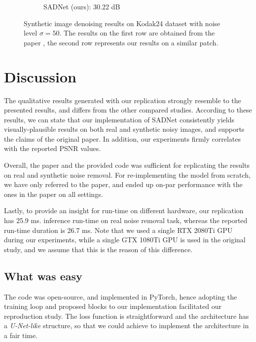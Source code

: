 \begin{figure}[t!]
\begin{subfigure}{0.25\textwidth}
      \caption{SADNet (ours): 30.22 dB}
      \label{fig:kodak_out}
    \end{subfigure}
    \caption{Synthetic image denoising results on Kodak24 dataset with noise level $\sigma = 50$. The results on the first row are obtained from the paper \cite{10.1007/978-3-030-58577-8_11}, the second row represents our results on a similar patch.}
    \label{fig:kodak_table}
\end{figure}


\section{Discussion}


The qualitative results generated with our replication strongly resemble to the presented results, and differs from the other compared studies. According to these results, we can state that our implementation of SADNet consistently yields visually-plausible results on both real and synthetic noisy images, and supports the claims of the original paper. In addition, our experiments firmly correlates with the reported PSNR values.

Overall, the paper and the provided code was sufficient for replicating the results on real and synthetic noise removal. For re-implementing the model from scratch, we have only referred to the paper, and ended up on-par performance with the ones in the paper on all settings. 

Lastly, to provide an insight for run-time on different hardware, our replication has 25.9 ms. inference run-time on real noise removal task, whereas the reported run-time duration is 26.7 ms. Note that we used a single RTX 2080Ti GPU during our experiments, while a single GTX 1080Ti GPU is used in the original study, and we assume that this is the reason of this difference.

\subsection{What was easy}

The code was open-source, and implemented in PyTorch, hence adopting the training loop and proposed blocks to our implementation facilitated our reproduction study. The loss function is straightforward and the architecture has a \textit{U-Net-like} structure, so that we could achieve to implement the architecture in a fair time. 

